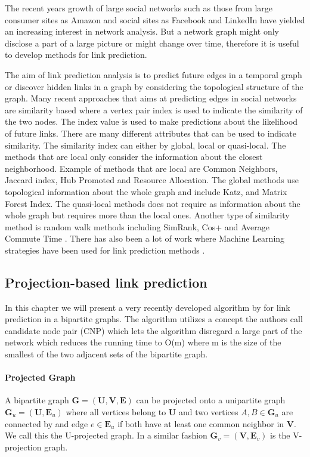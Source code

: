 The recent years growth of large social networks such as those from large consumer sites as Amazon and social sites as Facebook and LinkedIn have yielded an increasing interest in network analysis. But a network graph might only disclose a part of a large picture or might change over time, therefore it is useful to develop methods for link prediction.

The aim of link prediction analysis is to predict future edges in a temporal graph or discover hidden links in a graph by considering the topological structure of the graph. Many recent approaches that aims at predicting edges in social networks are similarity based where a vertex pair index is used to indicate the similarity of the two nodes. The index value is used to make predictions about the likelihood of future links. There are many different attributes that can be used to indicate similarity. The similarity index can either by global, local or quasi-local. The methods that are local only consider the information about the closest neighborhood. Example of methods that are local are Common Neighbors, Jaccard index, Hub Promoted and Resource Allocation\cite{linkpredict}. The global methods use topological information about the whole graph and include Katz, and Matrix Forest Index\cite{linkpredict}. The quasi-local methods does not require as information about the whole graph but requires more than the local ones. Another type of similarity method is random walk methods including SimRank, Cos+ and Average Commute Time \cite{linkpredict}. There has also been a lot of work where Machine Learning strategies have been used for link prediction methods \cite{mlpredict1,mlpredict2,mlpredict3,mlpredict4,mlpredict5,mlpredict6,mlpredict7}.

\subsection{Projection-based link prediction}\label{sec:plp}
In this chapter we will present a very recently developed algorithm by \citet{plp} for link prediction in a bipartite graphs. The algorithm utilizes a concept the authors call candidate node pair (CNP) which lets the algorithm disregard a large part of the network which reduces the running time to O(m) where m is the size of the smallest of the two adjacent sets of the bipartite graph.

\paragraph{Projected Graph}
A bipartite graph $\textbf{G} = (\textbf{U},\textbf{V},\textbf{E})$ can be projected onto a unipartite graph $\textbf{G}_u = (\textbf{U},\textbf{E}_u)$ where all vertices belong to $\textbf{U}$ and two vertices $A,B\in\textbf{G}_u$ are connected by and edge $e\in\textbf{E}_u$ if both have at least one common neighbor in $\textbf{V}$. We call this the U-projected graph. In a similar fashion $\textbf{G}_v = (\textbf{V},\textbf{E}_v)$ is the V-projection graph.

